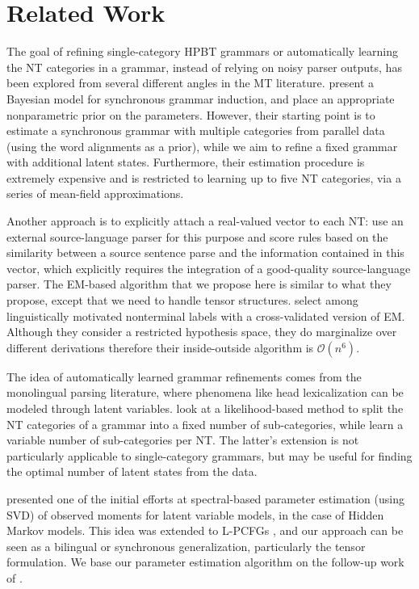 \documentclass[11pt]{article}
\begin{document}
\section{Related Work}
\label{sec:related}
The goal of refining single-category HPBT grammars or automatically learning the NT categories in a grammar, instead of relying on noisy parser outputs, has been explored from several different angles in the MT literature. 
 present a Bayesian model for synchronous grammar induction, and place an appropriate nonparametric prior on the parameters. 
However, their starting point is to estimate a synchronous grammar with multiple categories from parallel data (using the word alignments as a prior), while we aim to refine a fixed grammar with additional latent states.  
Furthermore, their estimation procedure is extremely expensive and is restricted to learning up to five NT categories, via a series of mean-field approximations. 

Another approach is to explicitly attach a real-valued vector to each NT:  use an external source-language parser for this purpose and score rules based on the similarity between a source sentence parse and the information contained in this vector, which explicitly requires the integration of a good-quality source-language parser. 
The EM-based algorithm that we propose here is similar to what they propose, except that we need to handle tensor structures.  
 select among linguistically motivated nonterminal labels with a cross-validated version of EM. Although they consider a restricted hypothesis space, they do marginalize over different derivations therefore their inside-outside algorithm is $\mathcal{O}(n^6)$.  

The idea of automatically learned grammar refinements comes from the monolingual parsing literature, where phenomena like head lexicalization can be modeled through latent variables.   look at a likelihood-based method to split the NT categories of a grammar into a fixed number of sub-categories, while  learn a variable number of sub-categories per NT.  The latter's extension is not particularly applicable to single-category grammars, but may be useful for finding the optimal number of latent states from the data.  

 presented one of the initial efforts at spectral-based parameter estimation (using SVD) of observed moments for latent variable models, in the case of Hidden Markov models. 
This idea was extended to L-PCFGs \cite{cohen-14b}, and our approach can be seen as a bilingual or synchronous generalization, particularly the tensor formulation.  
We base our parameter estimation algorithm on the follow-up work of .  
\end{document}
